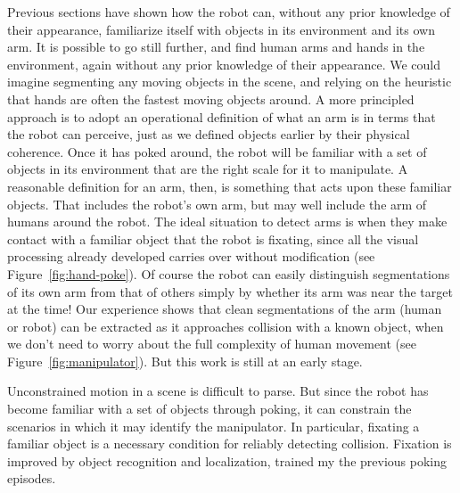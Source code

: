 Previous sections have shown how the robot can, without any prior
knowledge of their appearance, familiarize itself with objects in its
environment and its own arm.  It is possible to go still further, and
find human arms and hands in the environment, again without any prior
knowledge of their appearance.  We could imagine segmenting any moving
objects in the scene, and relying on the heuristic that hands are
often the fastest moving objects around.  A more principled approach
is to adopt an operational definition of what an arm is in terms that
the robot can perceive, just as we defined objects earlier by their
physical coherence.  Once it has poked around, the robot will be
familiar with a set of objects in its environment that are the right
scale for it to manipulate.  A reasonable definition for an arm, then,
is something that acts upon these familiar objects.  That includes the
robot's own arm, but may well include the arm of humans around the
robot. The ideal situation to detect arms is when they make contact
with a familiar object that the robot is fixating, since all the
visual processing already developed carries over without modification
(see Figure~\ref{fig:hand-poke}).  Of course the robot can easily
distinguish segmentations of its own arm from that of others simply by
whether its arm was near the target at the time!  Our experience shows
that clean segmentations of the arm (human or robot) can be extracted
as it approaches collision with a known object, when we don't need to
worry about the full complexity of human movement (see
Figure~\ref{fig:manipulator}).  But this work is still at an early stage.


\ifverbose

Unconstrained motion in a scene is difficult to parse.  But since the
robot has become familiar with a set of objects through poking, it can
constrain the scenarios in which it may identify the manipulator.  In
particular, fixating a familiar object is a necessary condition for
reliably detecting collision.  Fixation is improved by object recognition
and localization, trained my the previous poking episodes.

